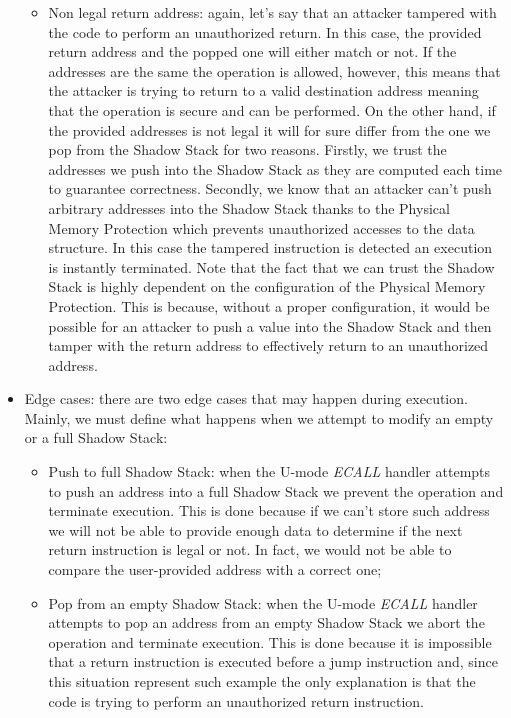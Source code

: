 \begin{itemize}
\begin{itemize}
      \item Non legal return address: again, let's say that an attacker tampered
        with the code to perform an unauthorized return. In this case, the provided
        return address and the popped one will either match or not. If the
        addresses are the same the operation is allowed, however, this means
        that the attacker is trying to return to a valid destination address
        meaning that the operation is secure and can be performed. On the other hand,
        if the provided addresses is not legal it will for sure differ from the
        one we pop from the Shadow Stack for two reasons. Firstly, we trust the
        addresses we push into the Shadow Stack as they are computed each time
        to guarantee correctness. Secondly, we know that an attacker can't push
        arbitrary addresses into the Shadow Stack thanks to the Physical Memory
        Protection which prevents unauthorized accesses to the data structure. In
        this case the tampered instruction is detected an execution is instantly
        terminated. Note that the fact that we can trust the Shadow Stack is
        highly dependent on the configuration of the Physical Memory Protection.
        This is because, without a proper configuration, it would be possible for
        an attacker to push a value into the Shadow Stack and then tamper with the
        return address to effectively return to an unauthorized address.
    \end{itemize}

  \item Edge cases: there are two edge cases that may happen during execution. Mainly,
    we must define what happens when we attempt to modify an empty or a full
    Shadow Stack:
    \begin{itemize}
      \item Push to full Shadow Stack: when the U-mode \textit{ECALL} handler attempts
        to push an address into a full Shadow Stack we prevent the operation and
        terminate execution. This is done because if we can't store such address
        we will not be able to provide enough data to determine if the next
        return instruction is legal or not. In fact, we would not be able to
        compare the user-provided address with a correct one;

      \item Pop from an empty Shadow Stack: when the U-mode \textit{ECALL} handler
        attempts to pop an address from an empty Shadow Stack we abort the operation
        and terminate execution. This is done because it is impossible that a
        return instruction is executed before a jump instruction and, since this
        situation represent such example the only explanation is that the code is
        trying to perform an unauthorized return instruction.
    \end{itemize}
\end{itemize}

